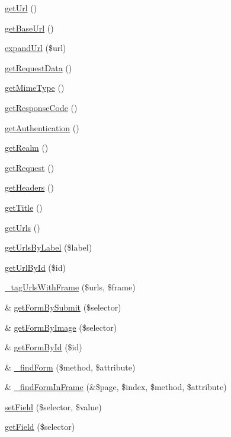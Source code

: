 \begin{DoxyCompactItemize}
\item 
\hyperlink{class_simple_frameset_a4126babe4b4451217db33c9f018a5ca3}{getUrl} ()
\item 
\hyperlink{class_simple_frameset_aa671398cb10ca0051d099e088131638c}{getBaseUrl} ()
\item 
\hyperlink{class_simple_frameset_a621c0d2d0fe4d920b879f1db4751d0ad}{expandUrl} (\$url)
\item 
\hyperlink{class_simple_frameset_aa920a4af7e2d5cbb35319111813edf5c}{getRequestData} ()
\item 
\hyperlink{class_simple_frameset_a2a0af45fe11ccdf1f5d575c903550939}{getMimeType} ()
\item 
\hyperlink{class_simple_frameset_a49557a01b0b0ce760bb5a4497c2e1055}{getResponseCode} ()
\item 
\hyperlink{class_simple_frameset_ac62ad599b9e34170dfc53e52cdbd18f8}{getAuthentication} ()
\item 
\hyperlink{class_simple_frameset_ace3bb1323f9525987fea97858f6a5dd5}{getRealm} ()
\item 
\hyperlink{class_simple_frameset_adf904d92dc2cc2da34d028929d200280}{getRequest} ()
\item 
\hyperlink{class_simple_frameset_a9491ea8656bb9c9beec2cb9a25caa5bb}{getHeaders} ()
\item 
\hyperlink{class_simple_frameset_ac2de6b564406233317763be69cb2b370}{getTitle} ()
\item 
\hyperlink{class_simple_frameset_a8d6ecab50471cf5107cb71ec07c7d48f}{getUrls} ()
\item 
\hyperlink{class_simple_frameset_a3a9ca9ce795e358526fee6138b435d85}{getUrlsByLabel} (\$label)
\item 
\hyperlink{class_simple_frameset_a68a27626e377cbbba7c12ae3a8f14ca1}{getUrlById} (\$id)
\item 
\hyperlink{class_simple_frameset_a24b046fe5f0522337963d458eb9bc966}{\_\-tagUrlsWithFrame} (\$urls, \$frame)
\item 
\& \hyperlink{class_simple_frameset_a53a0a27d308d7606d2b306d6424875e2}{getFormBySubmit} (\$selector)
\item 
\& \hyperlink{class_simple_frameset_ac9d92c8a3996e7cfc343f34e9ca7a74e}{getFormByImage} (\$selector)
\item 
\& \hyperlink{class_simple_frameset_a2aabf4ba66c9721cdf882a27d3db7a68}{getFormById} (\$id)
\item 
\& \hyperlink{class_simple_frameset_a4f8df47f61b47c7b6ff806b558d8fa8a}{\_\-findForm} (\$method, \$attribute)
\item 
\& \hyperlink{class_simple_frameset_a83c33da7a10c95c885d6ed02ccd249ac}{\_\-findFormInFrame} (\&\$page, \$index, \$method, \$attribute)
\item 
\hyperlink{class_simple_frameset_a6f8dec03f4f56a227b73e93cf005ed99}{setField} (\$selector, \$value)
\item 
\hyperlink{class_simple_frameset_aa8458cd2411765e664c3c693cbfd8588}{getField} (\$selector)
\end{DoxyCompactItemize}
